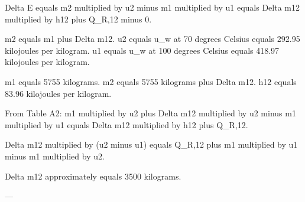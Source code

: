 Delta E equals m2 multiplied by u2 minus m1 multiplied by u1 equals Delta m12 multiplied by h12 plus Q_R,12 minus 0.  

m2 equals m1 plus Delta m12.  
u2 equals u_w at 70 degrees Celsius equals 292.95 kilojoules per kilogram.  
u1 equals u_w at 100 degrees Celsius equals 418.97 kilojoules per kilogram.  

m1 equals 5755 kilograms.  
m2 equals 5755 kilograms plus Delta m12.  
h12 equals 83.96 kilojoules per kilogram.  

From Table A2:  
m1 multiplied by u2 plus Delta m12 multiplied by u2 minus m1 multiplied by u1 equals Delta m12 multiplied by h12 plus Q_R,12.  

Delta m12 multiplied by (u2 minus u1) equals Q_R,12 plus m1 multiplied by u1 minus m1 multiplied by u2.  

Delta m12 approximately equals 3500 kilograms.  

---